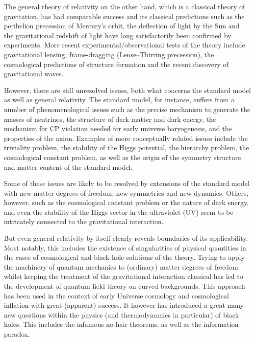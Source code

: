 \documentclass[11pt]{book} %
\numberwithin{equation}{chapter}
\begin{document}
The general theory of relativity on the other hand, which is a classical theory of gravitation,
has had comparable success and its
classical predictions such as the perihelion precession of Mercury's orbit, the deflection of light by the Sun
and the gravitational redshift of light have long satisfactorily been confirmed by experiments.
More recent experimental/observational tests of the theory include gravitational lensing,
frame-dragging (Lense–Thirring precession),
the cosmological predictions of structure formation
and the recent discovery of gravitational waves.

However, there are still unresolved issues, both what concerns the standard model as well
as general relativity.
The standard model, for instance, suffers from a number of phenomenological issues such as
the precise mechanism to generate the masses of neutrinos,
the structure of dark matter and dark energy,
the mechanism for CP violation needed for early universe baryogenesis,
and the properties of the axion.
Examples of more conceptually related issues include the triviality problem,
the stability of the Higgs potential,
the hierarchy problem,
the cosmological constant problem,
as well as
the origin of the symmetry structure and matter content of the standard model.

Some of these issues are likely to be resolved by extensions of the standard model
with new matter degrees of freedom, new symmetries and new dynamics. Others, however,
such as the cosmological constant problem or the nature of dark energy,
and even the stability of the Higgs sector
in the ultraviolet (UV) seem to be intricately connected to the gravitational interaction.

But even general relativity by itself clearly reveals boundaries of its applicability.
Most notably, this includes the existence of singularities of physical quantities
in the cases of cosmological and black hole solutions of the theory.
Trying to apply the machinery of quantum mechanics to (ordinary) matter degrees of freedom
whilst keeping the treatment of the gravitational interaction classical has led
to the development of quantum field theory on curved backgrounds. This approach has
been used in the context of early Universe cosmology and cosmological inflation with
great (apparent) success. It however has introduced a great many new questions within
the physics (and thermodynamics in particular) of black holes. This includes the
infamous no-hair theorems, as well as the information paradox.
\end{document}
